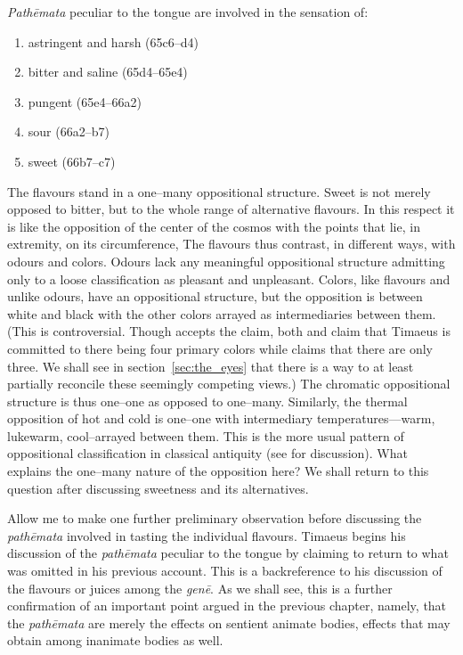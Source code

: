 \emph{Pathēmata} peculiar to the tongue are involved in the sensation of:
\begin{enumerate}
	\item astringent and harsh (65c6--d4)
	\item bitter and saline (65d4--65e4)
	\item pungent (65e4--66a2)
	\item sour (66a2--b7)
	\item sweet (66b7--c7)
\end{enumerate}
The flavours stand in a one--many oppositional structure. Sweet is not merely opposed to bitter, but to the whole range of alternative flavours. In this respect it is like the opposition of the center of the cosmos with the points that lie, in extremity, on its circumference, The flavours thus contrast, in different ways, with odours and colors. Odours lack any meaningful oppositional structure admitting only to a loose classification as pleasant and unpleasant. Colors, like flavours and unlike odours, have an oppositional structure, but the opposition is between white and black with the other colors arrayed as intermediaries between them. (This is controversial. Though \citealt[480--1]{Taylor:1928qb} accepts the claim, both \citealt{Brisson:1997qr} and \citealt{Ierodiakonou:2005ly} claim that Timaeus is committed to there being four primary colors while \citealt[277]{Cornford:1935fk} claims that there are only three. We shall see in section~\ref{sec:the_eyes} that there is a way to at least partially reconcile these seemingly competing views.) The chromatic oppositional structure is thus one--one as opposed to one--many. Similarly, the thermal opposition of hot and cold is one--one with intermediary temperatures---warm, lukewarm, cool--arrayed between them. This is the more usual pattern of oppositional classification in classical antiquity (see \citealt{Lloyd:1966ly} for discussion). What explains the one--many nature of the opposition here? We shall return to this question after discussing sweetness and its alternatives.

Allow me to make one further preliminary observation before discussing the \emph{pathēmata} involved in tasting the individual flavours. Timaeus begins his discussion of the \emph{pathēmata} peculiar to the tongue by claiming to return to what was omitted in his previous account. This is a backreference to his discussion of the flavours or juices among the \emph{genē}. As we shall see, this is a further confirmation of an important point argued in the previous chapter, namely, that the \emph{pathēmata} are merely the effects on sentient animate bodies, effects that may obtain among inanimate bodies as well.

